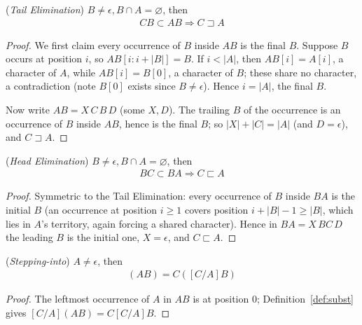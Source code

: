 \documentclass[runningheads,envcountsect]{llncs}
\begin{document}
\begin{lemma}
    (\emph{Tail Elimination})
    $B\neq\epsilon, B\cap A=\varnothing$, then
    \begin{align}
        CB\subset AB \Rightarrow C \sqsupset A
    \end{align}
\end{lemma}

\begin{proof}
    We first claim every occurrence of $B$ inside $AB$ is the final $B$. Suppose $B$ occurs at position $i$, so $AB[i{:}i+|B|] = B$. If $i < |A|$, then $AB[i] = A[i]$, a character of $A$, while $AB[i] = B[0]$, a character of $B$; these share no character, a contradiction (note $B[0]$ exists since $B\neq\epsilon$). Hence $i = |A|$, the final $B$.

    Now write $AB = X\,C\,B\,D$ (some $X, D$). The trailing $B$ of the occurrence is an occurrence of $B$ inside $AB$, hence is the final $B$; so $|X|+|C| = |A|$ (and $D = \epsilon$), and $C \sqsupset A$.
\end{proof}

\begin{lemma}
    (\emph{Head Elimination})
    $B\neq\epsilon, B\cap A=\varnothing$, then
    \begin{align}
        BC\subset BA \Rightarrow C \sqsubset A
    \end{align}
\end{lemma}

\begin{proof}
    Symmetric to the Tail Elimination: every occurrence of $B$ inside $BA$ is the initial $B$ (an occurrence at position $i \ge 1$ covers position $i+|B|-1 \ge |B|$, which lies in $A$'s territory, again forcing a shared character). Hence in $BA = X\,BC\,D$ the leading $B$ is the initial one, $X = \epsilon$, and $C \sqsubset A$.
\end{proof}

\begin{lemma}
    (\emph{Stepping-into})
    $A\neq \epsilon$, then
    \begin{align}
        [C/A] (AB) = C([C/A]B)
    \end{align}
\end{lemma}

\begin{proof}
    The leftmost occurrence of $A$ in $AB$ is at position $0$; Definition~\ref{def:subst} gives $[C/A](AB) = C[C/A]B$.
\end{proof}
\end{document}
